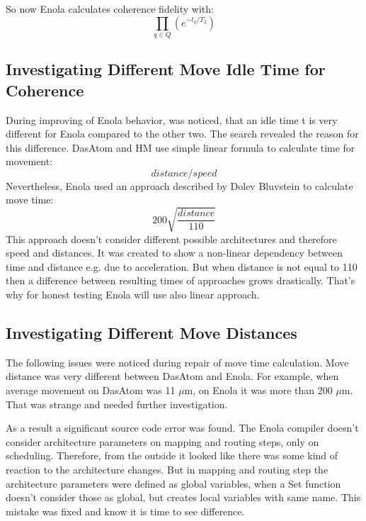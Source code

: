 So now Enola calculates coherence fidelity with: \[\prod_{q \in Q} \left(e^{-t_q / T_2} \right)\]

\subsection{Investigating Different Move Idle Time for Coherence}
During improving of Enola behavior, was noticed, that an idle time t is very different for Enola compared to the other two.
The search revealed the reason for this difference. DasAtom and \ac{HM} use simple linear formula to calculate time for movement: \[distance/speed\]
Nevertheless, Enola used an approach described by Dolev Bluvstein to calculate move time:
\[200 \sqrt{\frac{distance}{110}}\]
This approach doesn't consider different possible architectures and therefore speed and distances. 
It was created to show a non-linear dependency between time and distance e.g. due to acceleration.
But when distance is not equal to 110 then a difference between resulting times of approaches grows drastically.
That's why for honest testing Enola will use also linear approach.

\subsection{Investigating Different Move Distances}
The following issues were noticed during repair of move time calculation. 
Move distance was very different between DasAtom and Enola. 
For example, when average movement on DasAtom was 11 $\mu$m, on Enola it was more than 200 $\mu$m. 
That was strange and needed further investigation.

As a result a significant source code error was found. 
The Enola compiler doesn't consider architecture parameters on mapping and routing steps, only on scheduling.
Therefore, from the outside it looked like there was some kind of reaction to the architecture changes.
But in mapping and routing step the architecture parameters were defined as global variables, 
when a Set function doesn't consider those as global, but creates local variables with same name.
This mistake was fixed and know it is time to see difference.

